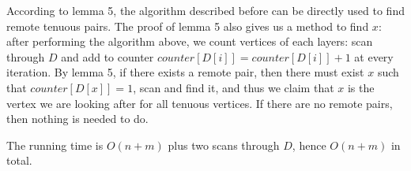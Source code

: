 \documentclass{report}
\begin{document}
    According to lemma 5, the algorithm described before can be directly used to find
    remote tenuous pairs. The proof of lemma 5 also gives us a method to find $x$: after 
    performing the algorithm above, we count vertices of each layers: scan through $D$ and
    add to counter $counter[D[i]] = counter[D[i]]+1$ at every iteration.  By lemma 5, 
    if there exists a remote pair, then there must exist $x$ such that $counter[D[x]] = 1$, 
    scan and find it, and thus we claim that $x$ is the vertex we are looking after for all
    tenuous vertices. If there are no remote pairs, then nothing is needed to do.

    The running time is $O(n + m)$ plus two scans through $D$, hence $O(n+m)$ in total.
     
    
\end{document}
